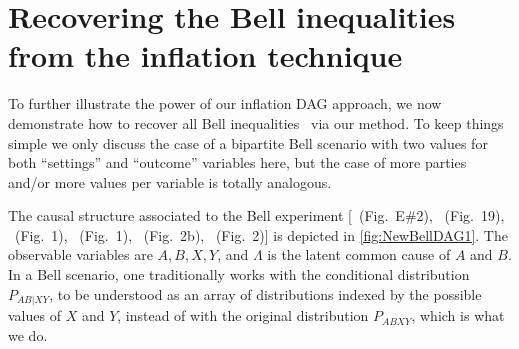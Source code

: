 \documentclass[aps,english,superscriptaddress,onecolumn,twoside,longbibliography,pra,floatfix,fleqn,nofootinbib]{revtex4-1}%
\theoremstyle{definition}
\begin{document}
\section{Recovering the Bell inequalities from the inflation technique}
\label{sec:Bellscenarios}


To further illustrate the power of our inflation DAG approach, we now demonstrate how to recover all Bell inequalities~\cite{Brunner2013Bell,bell1966lhvm,CHSHOriginal} via our method. To keep things simple we only discuss the case of a bipartite Bell scenario with two values for both ``settings'' and ``outcome'' variables here, but the case of more parties and/or more values per variable is totally analogous.

The causal structure associated to the Bell \cite{bell1964einstein,Brunner2013Bell,bell1966lhvm,CHSHOriginal} experiment [\citealp{pusey2014gdag}~(Fig.~E\#2), \citealp{WoodSpekkens}~(Fig.~19), \citealp{chaves2014novel}~(Fig.~1), \citealp{BeyondBellII}~(Fig.~1), \citealp{wolfe2015nonconvexity}~(Fig.~2b), \citealp{steeg2011relaxation}~(Fig.~2)] is depicted in \cref{fig:NewBellDAG1}. The observable variables are $A,B,X,Y$, and $\Lambda$ is the latent common cause of $A$ and $B$. In a Bell scenario, one traditionally works with the conditional distribution $P_{AB|XY}$, to be understood as an array of distributions indexed by the possible values of $X$ and $Y$, instead of with the original distribution $P_{ABXY}$, which is what we do.
\end{document}
